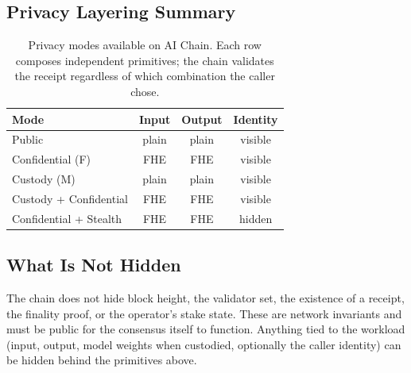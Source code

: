 \subsection{Privacy Layering Summary}

\begin{table}[h]
\centering
\small
\begin{tabular}{lccc}
\toprule
\textbf{Mode} & \textbf{Input} & \textbf{Output} & \textbf{Identity} \\
\midrule
Public               & plain & plain & visible \\
Confidential (F)     & FHE   & FHE   & visible \\
Custody (M)          & plain & plain & visible \\
Custody + Confidential & FHE & FHE & visible \\
Confidential + Stealth & FHE & FHE & hidden \\
\bottomrule
\end{tabular}
\caption{Privacy modes available on AI Chain. Each row composes
independent primitives; the chain validates the receipt regardless of
which combination the caller chose.}
\end{table}

\subsection{What Is Not Hidden}

The chain does not hide block height, the validator set, the existence
of a receipt, the finality proof, or the operator's stake state.
These are network invariants and must be public for the consensus
itself to function. Anything tied to the workload (input, output,
model weights when custodied, optionally the caller identity) can be
hidden behind the primitives above.
